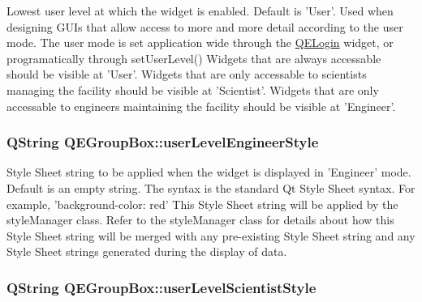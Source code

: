 Lowest user level at which the widget is enabled. Default is 'User'. Used when designing GUIs that allow access to more and more detail according to the user mode. The user mode is set application wide through the \hyperlink{classQELogin}{QELogin} widget, or programatically through setUserLevel() Widgets that are always accessable should be visible at 'User'. Widgets that are only accessable to scientists managing the facility should be visible at 'Scientist'. Widgets that are only accessable to engineers maintaining the facility should be visible at 'Engineer'. \hypertarget{classQEGroupBox_a56cdaa9cf2d9e1682f7f249c9b949361}{
\subsubsection[{userLevelEngineerStyle}]{\setlength{\rightskip}{0pt plus 5cm}QString QEGroupBox::userLevelEngineerStyle}}
\label{classQEGroupBox_a56cdaa9cf2d9e1682f7f249c9b949361}
Style Sheet string to be applied when the widget is displayed in 'Engineer' mode. Default is an empty string. The syntax is the standard Qt Style Sheet syntax. For example, 'background-\/color: red' This Style Sheet string will be applied by the styleManager class. Refer to the styleManager class for details about how this Style Sheet string will be merged with any pre-\/existing Style Sheet string and any Style Sheet strings generated during the display of data. \hypertarget{classQEGroupBox_a5d1841110a7dd0733755640f5ebd0713}{
\subsubsection[{userLevelScientistStyle}]{\setlength{\rightskip}{0pt plus 5cm}QString QEGroupBox::userLevelScientistStyle}}
\label{classQEGroupBox_a5d1841110a7dd0733755640f5ebd0713}

